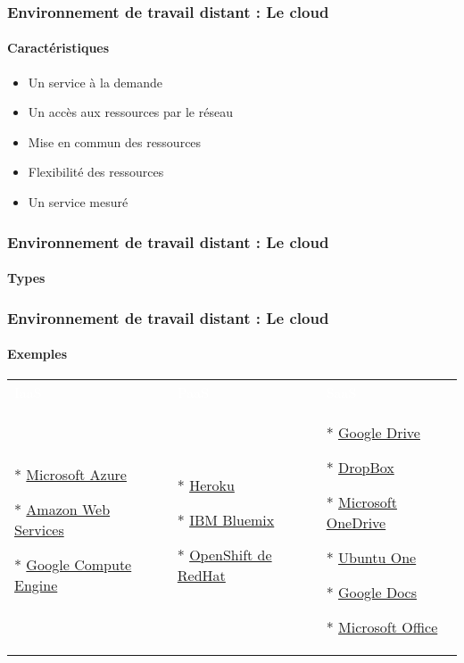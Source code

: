 \documentclass[xcolor=table]{beamer}
\begin{document}
\begin{frame}
\frametitle{Environnement de travail distant : Le cloud}
\framesubtitle{Caractéristiques}

\begin{itemize}
	\item Un service à la demande
	\item Un accès aux ressources par le réseau
	\item Mise en commun des ressources
	\item Flexibilité des ressources
	\item Un service mesuré
\end{itemize}


\end{frame}


\begin{frame}
\frametitle{Environnement de travail distant : Le cloud}
\framesubtitle{Types}


\end{frame}

\begin{frame}
\frametitle{Environnement de travail distant : Le cloud}
\framesubtitle{Exemples}

\begin{tabular}{p{}p{}p{}}
	\rowcolor{darkblue}
	\textcolor{white}{IaaS}  & \textcolor{white}{PaaS} & \textcolor{white}{SaaS} \\
	
	* \href{http://azure.microsoft.com/}{Microsoft Azure}
	
	* \href{https://aws.amazon.com}{Amazon Web Services}
	
	* \href{https://cloud.google.com/compute/}{Google Compute Engine}
	
	&
	
	* \href{https://www.heroku.com}{Heroku}
	
	* \href{https://www.ibm.com/cloud-computing/bluemix/}{IBM Bluemix}
	
	* \href{https://www.openshift.org/}{OpenShift de RedHat}
	
	&
	
	* \href{https://www.google.com/drive/}{Google Drive}
	
	* \href{https://www.dropbox.com/}{DropBox}
	
	* \href{https://onedrive.live.com/}{Microsoft OneDrive}
	
	* \href{http://one.ubuntu.com/}{Ubuntu One}
	 
	* \href{https://docs.google.com/}{Google Docs}
	
	* \href{https://microsoftonline.com}{Microsoft Office}
	\\
\end{tabular}


\end{frame}
\end{document}
